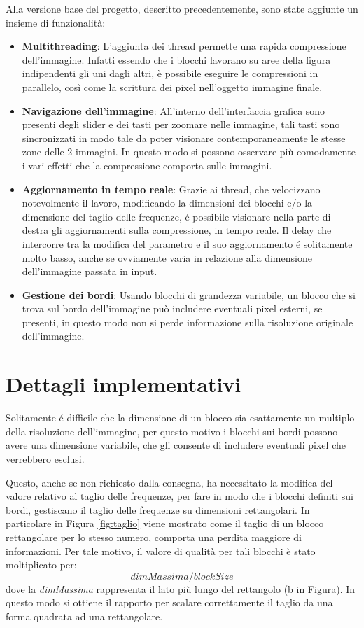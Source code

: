 Alla versione base del progetto, descritto precedentemente, sono state aggiunte un insieme di funzionalità:

\begin{itemize}
	\item \textbf{Multithreading}: L'aggiunta dei thread permette una rapida compressione dell'immagine. Infatti essendo che i blocchi lavorano su aree della figura indipendenti gli uni dagli altri, è possibile eseguire le compressioni in parallelo, così come la scrittura dei pixel nell'oggetto immagine finale.
	\item \textbf{Navigazione dell'immagine}: All'interno dell'interfaccia grafica sono presenti degli slider e dei tasti per zoomare nelle immagine, tali tasti sono sincronizzati in modo tale da poter visionare contemporaneamente le stesse zone delle 2 immagini. In questo modo si possono osservare più comodamente i vari effetti che la compressione comporta sulle immagini.
	\item \textbf{Aggiornamento in tempo reale}: Grazie ai thread, che velocizzano notevolmente il lavoro, modificando la dimensioni dei blocchi e/o la dimensione del taglio delle frequenze, é possibile visionare nella parte di destra gli aggiornamenti sulla compressione, in tempo reale. Il delay che intercorre tra la modifica del parametro e il suo aggiornamento é solitamente molto basso, anche se ovviamente varia in relazione alla dimensione dell'immagine passata in input.
	\item  \textbf{Gestione dei bordi}: Usando blocchi di grandezza variabile, un blocco che si trova sul bordo dell'immagine può includere eventuali pixel esterni, se presenti, in questo modo non si perde informazione sulla risoluzione originale dell'immagine.
\end{itemize}

\section{Dettagli implementativi}

Solitamente é difficile che la dimensione di un blocco sia esattamente un multiplo della risoluzione dell'immagine, per questo motivo i blocchi sui bordi possono avere una dimensione variabile, che gli consente di includere eventuali pixel che verrebbero esclusi.

Questo, anche se non richiesto dalla consegna, ha necessitato la modifica del valore relativo al taglio delle frequenze, per fare in modo che i blocchi definiti sui bordi, gestiscano il taglio delle frequenze su dimensioni rettangolari. In particolare in Figura \ref{fig:taglio} viene mostrato come il taglio di un blocco rettangolare per lo stesso numero, comporta una perdita maggiore di informazioni. Per tale motivo, il valore di qualità per tali blocchi è stato moltiplicato per: \[ dimMassima / blockSize \] dove la \textit{dimMassima} rappresenta il lato più lungo del rettangolo (b in Figura). In questo modo si ottiene il rapporto per scalare correttamente il taglio da una forma quadrata ad una rettangolare.



